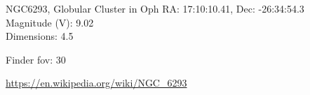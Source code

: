 \begin{block}{NGC6293, Globular Cluster in Oph}
    RA: 17:10:10.41, Dec: -26:34:54.3 \\ 
    Magnitude (V): 9.02 \\ 
    Dimensions: 4.5 

    Finder fov: 30 

    \url{https://en.wikipedia.org/wiki/NGC_6293} 
\end{block}